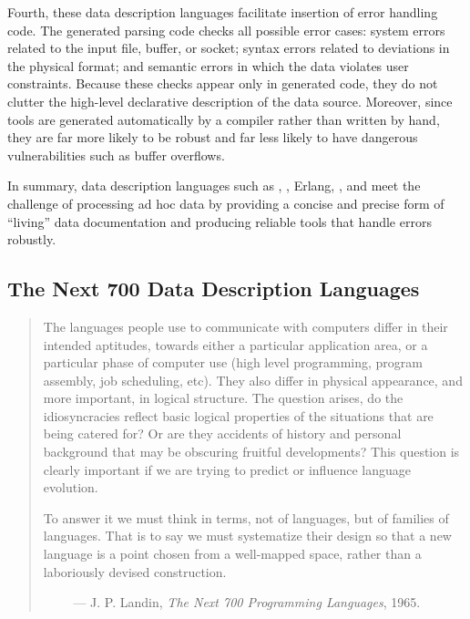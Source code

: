 Fourth, these data description languages 
facilitate insertion of error handling code. 
The generated parsing code checks all possible
error cases: system errors related to the input file, buffer, or
socket; syntax errors related to deviations in the physical format;
and semantic errors in which the data violates user
constraints. Because these checks appear only in generated code, they
do not clutter the high-level declarative description of the data
source. Moreover, since tools are generated automatically by a
compiler rather than written by hand, they are far more likely to be
robust and far less likely to have dangerous vulnerabilities such as
buffer overflows. 

In summary, data description languages such as \datascript{},
\packettypes{}, Erlang, \blt{}, and \pads{} meet the challenge of
processing ad hoc data by providing a concise and precise form of
``living'' data documentation and producing reliable tools that handle
errors robustly.


\subsection{The Next 700 Data Description Languages}

\begin {quote}
The languages people use to communicate with computers differ in their intended aptitudes, towards either a
particular application area, or a particular phase of computer use (high level programming, program assembly,
job scheduling, etc). They also differ in physical appearance, and more important, in logical structure. The question arises, do the idiosyncracies reflect basic logical
properties of the situations that are being catered for?
Or are they accidents of history and personal background
that may be obscuring fruitful developments? This
question is clearly important if we are trying to predict or
influence language evolution.

To answer it we must think in terms, not of languages,
but of families of languages. That is to say we must
systematize their design so that a new language is a point
chosen from a well-mapped space, rather than a laboriously
devised construction.

$\qquad$ --- J. P. Landin, {\em The Next 700 Programming Languages}, 1965.
\end{quote}


